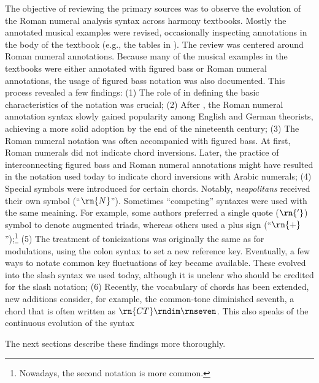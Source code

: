 The objective of reviewing the primary sources was to
observe the evolution of the Roman numeral analysis syntax
across harmony textbooks. Mostly the annotated musical
examples were revised, occasionally inspecting annotations
in the body of the textbook (e.g., the tables in
\textcite{kirnberger1774kunst}). The review was centered
around Roman numeral annotations. Because many of the
musical examples in the textbooks were either annotated with
figured bass or Roman numeral annotations, the usage of
figured bass notation was also documented. This process
revealed a few findings: (1) The role of
\textcite{weber1817versuch} in defining the basic
characteristics of the notation was crucial; (2) After
\textcite{weber1817versuch}, the Roman numeral annotation
syntax slowly gained popularity among English and German
theorists, achieving a more solid adoption by the end of the
nineteenth century; (3) The Roman numeral notation was often
accompanied with figured bass. At first, Roman numerals did
not indicate chord inversions. Later, the practice of
interconnecting figured bass and Roman numeral annotations
might have resulted in the notation used today to indicate
chord inversions with Arabic numerals; (4) Special symbols
were introduced for certain chords. Notably,
\emph{neapolitans} received their own symbol (``$\rn{N}$'').
Sometimes ``competing'' syntaxes were used with the same
meaining. For example, some authors preferred a single quote
($\rn{'}$) symbol to denote augmented triads, whereas others
used a plus sign (``$\rn{+}$'');\footnote{Nowadays, the
second notation is more common.} (5) The treatment of
tonicizations was originally the same as for modulations,
using the colon syntax to set a new reference key.
Eventually, a few ways to notate common key fluctuations of
key became available. These evolved into the slash syntax we
used today, although it is unclear who should be credited
for the slash notation; (6) Recently, the vocabulary of
chords has been extended, new additions consider, for
example, the common-tone diminished seventh, a chord that is
often written as $\rn{CT}\rndim\rnseven$. This also speaks
of the continuous evolution of the syntax


The next sections describe these findings more thoroughly.
